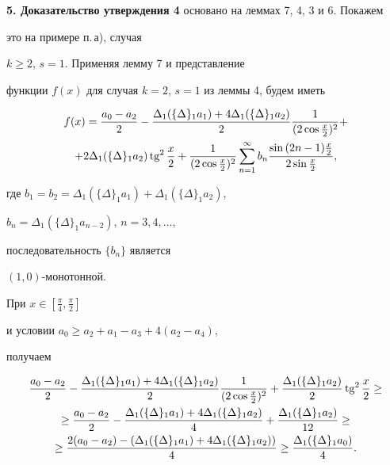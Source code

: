 \medskip





{\bf 5. Доказательство утверждения 4} основано на леммах 7, 4, 3 и 6. Покажем


это на примере п.\,а), случая


$k \geq 2$, $s=1$. Применяя лемму 7 и представление


функции $f(x)$ для случая $k=2$, $s=1$ из леммы 4, будем иметь


\begin{multline*}


f(x)= \frac {a_0 - a_2}{2} -


\frac {\Delta_1(\{\Delta\}_1 a_1) + 4 \Delta_1(\{\Delta\}_1 a_2)}{2}


\frac {1}{(2 \cos \frac{x}{2})^2} + \\


+2 \Delta_1(\{\Delta\}_1 a_2) \tg^2 \frac{x}{2} +


\frac{1}{(2 \cos \frac{x}{2})^2}


\sum\limits_{n=1}^{\infty} b_n\frac{\sin {(2n-1) 


\frac{x}{2}}}{2 \sin \frac{x}{2}},


\end{multline*}


где $b_1=b_2= \Delta_1(\{\Delta\}_1 a_1) + 


\Delta_1(\{\Delta\}_1 a_2)$,


$b_n= \Delta_1(\{\Delta\}_1 a_{n-2})$, $n=3,4,\dotsc$,


последовательность $\{b_n\}$ является


$(1,0)$-монотонной.


При $x \in [ \frac{\pi}{4}, \frac{\pi}{2} ]$ 


и условии $a_0 \geq a_2 + a_1 - a_3 + 4(a_2 - a_4)$, 


получаем 


\begin{multline*}


\frac{a_0-a_2}{2} - 


\frac{\Delta_1(\{\Delta \}_1 a_1)+4 \Delta_1(\{ \Delta \}_1 a_2)}{2}


\frac{1}{(2 \cos {\frac{x}{2}})^2} +


\frac{\Delta_1(\{ \Delta \}_1 a_2)}{2} \tg^2 {\frac{x}{2}} \geq \\


%


\ge\frac{a_0 - a_2}{2} -


\frac{\Delta_1 (\{ \Delta \}_1 a_1) + 4\Delta_1 (\{ \Delta \}_1 a_2)}{4}


+ \frac{\Delta_1 (\{ \Delta \}_1 a_2)}{12} \geq \\


%


\ge \frac{2(a_0 - a_2) - (\Delta_1 ( \{ \Delta \}_1 a_1) +


4 \Delta_1 (\{ \Delta \}_1 a_2))}{4} \geq


\frac{\Delta_1 (\{ \Delta \}_1 a_0) }{4}.


\end{multline*}


